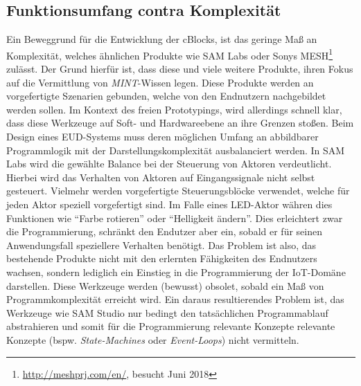 \subsection{Funktionsumfang contra Komplexität}
Ein Beweggrund für die Entwicklung der cBlocks, ist das geringe Maß an Komplexität, welches ähnlichen Produkte wie SAM Labs oder Sonys MESH\footnote{\url{http://meshprj.com/en/}, besucht Juni 2018} zulässt. Der Grund hierfür ist, dass diese und viele weitere Produkte, ihren Fokus auf die Vermittlung von \textit{MINT}-Wissen legen. Diese Produkte werden an vorgefertigte Szenarien gebunden, welche von den Endnutzern nachgebildet werden sollen. Im Kontext des freien Prototypings, wird allerdings schnell klar, dass diese Werkzeuge auf Soft- und Hardwareebene an ihre Grenzen stoßen. Beim Design eines \ac{EUD}-Systems muss deren möglichen Umfang an abbildbarer Programmlogik mit der Darstellungskomplexität ausbalanciert werden. In SAM Labs wird die gewählte Balance bei der Steuerung von Aktoren verdeutlicht. Hierbei wird das Verhalten von Aktoren auf Eingangssignale nicht selbst gesteuert. Vielmehr werden vorgefertigte Steuerungsblöcke verwendet, welche für jeden Aktor speziell vorgefertigt sind. Im Falle eines LED-Aktor währen dies Funktionen wie "`Farbe rotieren"' oder "`Helligkeit ändern"'. Dies erleichtert zwar die Programmierung, schränkt den Endutzer aber ein, sobald er für seinen Anwendungsfall speziellere Verhalten benötigt. Das Problem ist also, das bestehende Produkte nicht mit den erlernten Fähigkeiten des Endnutzers wachsen, sondern lediglich ein Einstieg in die Programmierung der \ac{IoT}-Domäne darstellen. Diese Werkzeuge werden (bewusst) obsolet, sobald ein Maß von Programmkomplexität erreicht wird. Ein daraus resultierendes Problem ist, das Werkzeuge wie SAM Studio nur bedingt den tatsächlichen Programmablauf abstrahieren und somit für die Programmierung relevante Konzepte relevante Konzepte (bspw. \textit{State-Machines} oder \textit{Event-Loops}) nicht vermitteln.

